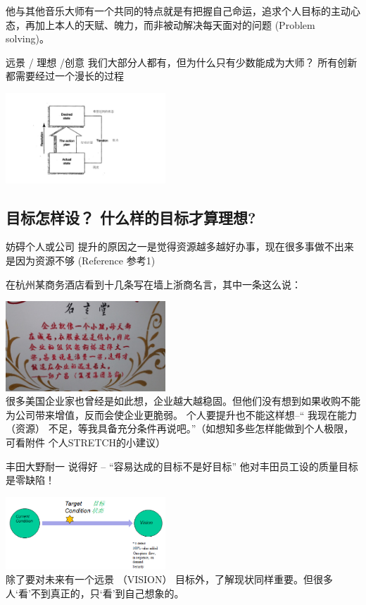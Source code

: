 他与其他音乐大师有一个共同的特点就是有把握自己命运，追求个人目标的主动心态，再加上本人的天赋、魄力，而非被动解决每天面对的问题
(Problem solving)。

远景 / 理想 /创意 我们大部分人都有，但为什么只有少数能成为大师？
所有创新都需要经过一个漫长的过程

\includegraphics[width=6cm]{liuct.jpg}\\

\hypertarget{ux76eeux6807ux600eux6837ux8bbe-ux4ec0ux4e48ux6837ux7684ux76eeux6807ux624dux7b97ux7406ux60f3}{%
\subsection{目标怎样设？
什么样的目标才算理想?}\label{ux76eeux6807ux600eux6837ux8bbe-ux4ec0ux4e48ux6837ux7684ux76eeux6807ux624dux7b97ux7406ux60f3}}

妨碍个人或公司
提升的原因之一是觉得资源越多越好办事，现在很多事做不出来是因为资源不够
(Reference 参考1)

在杭州某商务酒店看到十几条写在墙上浙商名言，其中一条这么说：

\includegraphics[width=6cm]{mingyant.jpg}\\
很多美国企业家也曾经是如此想，企业越大越稳固。但他们没有想到如果收购不能为公司带来增值，反而会使企业更脆弱。
个人要提升也不能这样想--`` 我现在能力 （资源）
不足，等我具备充分条件再说吧。''（如想知多些怎样能做到个人极限，可看附件
个人STRETCH的小建议）

丰田大野耐一 说得好 -- ``容易达成的目标不是好目标''
他对丰田员工设的质量目标是零缺陷！

\includegraphics[width=6cm]{mubiaozhungt.jpg}\\
除了要对未来有一个远景 （VISION）
目标外，了解现状同样重要。但很多人`看'不到真正的，只`看'到自己想象的。

